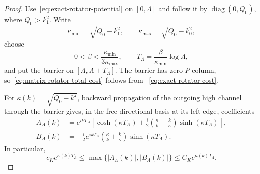 \documentclass[11pt]{article}
\DeclareMathOperator{\diag}{diag}
\theoremstyle{definition}
\theoremstyle{remark}
\begin{document}
\begin{proof}
Use~\eqref{eq:exact-rotator-potential} on $[0,\Lambda]$ and follow it by
$\diag(0,Q_0)$, where $Q_0>k_1^2$.  Write
\begin{equation}
 \kappa_{\min}=\sqrt{Q_0-k_1^2},\qquad
 \kappa_{\max}=\sqrt{Q_0-k_0^2},
\end{equation}
choose
\begin{equation}
 0<\beta<\frac{\kappa_{\min}}{3\kappa_{\max}},
 \qquad
 T_\Lambda=\frac{\beta}{\kappa_{\min}}\log\Lambda,
 \label{eq:shorter-barrier-choice}
\end{equation}
and put the barrier on $[\Lambda,\Lambda+T_\Lambda]$.  The barrier has zero
$P$-column, so~\eqref{eq:matrix-rotator-total-cost} follows from
~\eqref{eq:exact-rotator-cost}.

For $\kappa(k)=\sqrt{Q_0-k^2}$, backward propagation of the outgoing high
channel through the barrier gives, in the free directional basis at its left
edge, coefficients
\begin{align}
 A_\Lambda(k)
 &=e^{ikT_\Lambda}\left[
 \cosh(\kappa T_\Lambda)
 +\frac{i}{2}\left(\frac{\kappa}{k}-\frac{k}{\kappa}\right)
 \sinh(\kappa T_\Lambda)\right],\label{eq:barrier-A}\\
 B_\Lambda(k)
 &=-\frac{i}{2}e^{ikT_\Lambda}
 \left(\frac{\kappa}{k}+\frac{k}{\kappa}\right)
 \sinh(\kappa T_\Lambda).\label{eq:barrier-B}
\end{align}
In particular,
\begin{equation}
 c_K e^{\kappa(k)T_\Lambda}
 \leq\max\{|A_\Lambda(k)|,|B_\Lambda(k)|\}
 \leq C_K e^{\kappa(k)T_\Lambda}.
 \label{eq:barrier-coefficient-size}
\end{equation}


\end{proof}
\end{document}
